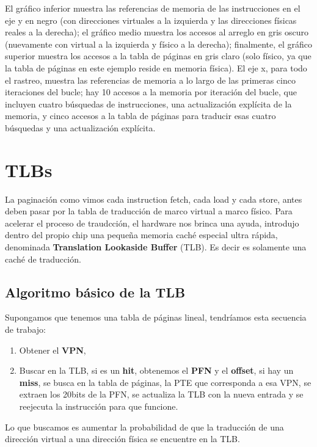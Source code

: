 \documentclass{article}
\begin{document}
El gráfico inferior muestra las referencias de memoria de las instrucciones en el eje y en negro (con direcciones virtuales a la izquierda y las direcciones físicas reales a la derecha); el gráfico medio muestra los accesos al arreglo en gris oscuro (nuevamente con virtual a la izquierda y físico a la derecha); finalmente, el gráfico superior muestra los accesos a la tabla de páginas en gris claro (solo físico, ya que la tabla de páginas en este ejemplo reside en memoria física). El eje x, para todo el rastreo, muestra las referencias de memoria a lo largo de las primeras cinco iteraciones del bucle; hay 10 accesos a la memoria por iteración del bucle, que incluyen cuatro búsquedas de instrucciones, una actualización explícita de la memoria, y cinco accesos a la tabla de páginas para traducir esas cuatro búsquedas y una actualización explícita.

\section{TLBs}
La paginación como vimos cada instruction fetch, cada load y cada store, antes deben pasar por la tabla de traducción de marco virtual a marco físico. Para acelerar el proceso de traudcción, el hardware nos brinca una ayuda, introdujo dentro del propio chip una pequeña memoria caché especial ultra rápida, denominada \textbf{Translation Lookaside Buffer} (TLB). Es decir es solamente una caché de traducción.

\subsection{Algoritmo básico de la TLB}
Supongamos que tenemos una tabla de páginas lineal, tendríamos esta secuencia de trabajo:
\begin{enumerate}
    \item Obtener el \textbf{VPN},
    \item Buscar en la TLB, si es un \textbf{hit}, obtenemos el \textbf{PFN} y el \textbf{offset}, si hay un \textbf{miss}, se busca en la tabla de páginas, la PTE que corresponda a esa VPN, se extraen los 20bits de la PFN, se actualiza la TLB con la nueva entrada y se reejecuta la instrucción para que funcione.
\end{enumerate}
Lo que buscamos es aumentar la probabilidad de que la traducción de una dirección virtual a una dirección física se encuentre en la TLB.
\end{document}
